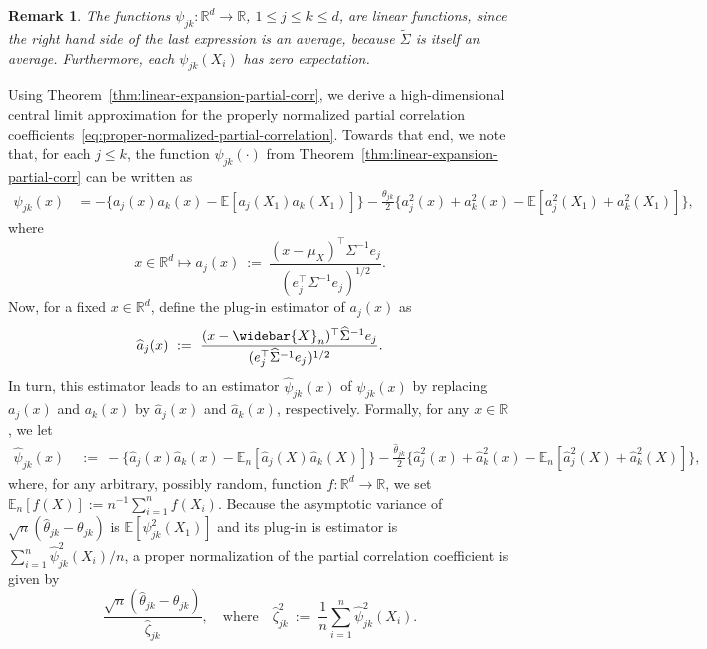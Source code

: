\documentclass[11pt]{article}
\newtheorem{remark}[theorem]{Remark}
\begin{document}
\begin{remark}
The functions $\psi_{jk} \colon \mathbb{R}^d \rightarrow \mathbb{R}$, $1 \leq j \leq k \leq d$, are linear functions, since the right hand side of the last expression is an average, because $\widetilde{\Sigma}$ is itself an average.
Furthermore, each  $\psi_{jk}(X_i)$ has zero expectation.
\end{remark}




Using Theorem~\ref{thm:linear-expansion-partial-corr}, we derive a high-dimensional central limit approximation  for the properly normalized partial correlation coefficients~\eqref{eq:proper-normalized-partial-correlation}. Towards that end, we note that, for each $j \leq k$, the function  $\psi_{jk}(\cdot)$ from Theorem~\ref{thm:linear-expansion-partial-corr} can be written as
\begin{equation}\label{eq:def-psi-jk}
\begin{split}
\psi_{jk}(x) &= -\bigg\{a_j(x)a_k(x) - \mathbb{E}[a_j(X_1)a_k(X_1)]\bigg\}
- \frac{\theta_{jk}}{2}\bigg\{a_j^2(x) + a_k^2(x) - \mathbb{E}[a_j^2(X_1) + a_k^2(X_1)]\bigg\},
\end{split}
\end{equation}
where
\begin{equation}\label{eq:ajx-function}
x \in \mathbb{R}^d \mapsto a_j(x) ~:=~ \frac{(x - \mu_X)^{\top}\Sigma^{-1}e_j}{(e_j^{\top}\Sigma^{-1}e_j)^{1/2}}.
\end{equation}
Now, for a fixed $x \in \mathbb{R}^d$, define the plug-in estimator of $a_j(x)$ as
\begin{equation}\label{eq:ajhatx-function}
\widehat{a}_j(x) ~:=~ \frac{(x - \widebar{X}_n)^{\top}\widehat{\Sigma}^{-1}e_j}{(e_j^{\top}\widehat{\Sigma}^{-1}e_j)^{1/2}}.
\end{equation}
In turn, this estimator leads to an estimator $\widehat{\psi}_{jk}(x)$ of $\psi_{jk}(x)$ by replacing $a_j(x)$ and $a_k(x)$ by $\widehat{a}_j(x)$ and $\widehat{a}_k(x)$, respectively.  Formally, for any $x \in \mathbb{R}$, we let
\begin{equation}\label{eq:def-widehat-psi-jk}
\begin{split}
\widehat{\psi}_{jk}(x) ~&:=~ -\bigg\{\widehat{a}_j(x)\widehat{a}_k(x) - \mathbb{E}_n[\widehat{a}_j(X)\widehat{a}_k(X)]\bigg\}
- \frac{\widehat{\theta}_{jk}}{2}\bigg\{\widehat{a}_j^2(x) + \widehat{a}_k^2(x) - \mathbb{E}_n[\widehat{a}_j^2(X) + \widehat{a}_k^2(X)]\bigg\},
\end{split}
\end{equation}
where, for any arbitrary, possibly random, function $f \colon \mathbb{R}^d \rightarrow \mathbb{R}$,  we set $\mathbb{E}_n[f(X)] := n^{-1}\sum_{i=1}^n f(X_i)$. Because the asymptotic variance of $\sqrt{n}(\widehat{\theta}_{jk} - \theta_{jk})$ is $\mathbb{E}[\psi_{jk}^2(X_1)]$ and its plug-in is estimator is $\sum_{i=1}^n \widehat{\psi}_{jk}^2(X_i)/n$, a proper normalization of the partial correlation coefficient is given by 
\[
\frac{\sqrt{n}(\widehat{\theta}_{jk} - \theta_{jk})}{\widehat{\zeta}_{jk}}, \quad \text{where} \quad 
\widehat{\zeta}_{jk}^2 ~:=~ {\frac{1}{n}\sum_{i=1}^n \widehat{\psi}_{jk}^2(X_i)}.
\] 
\end{document}
